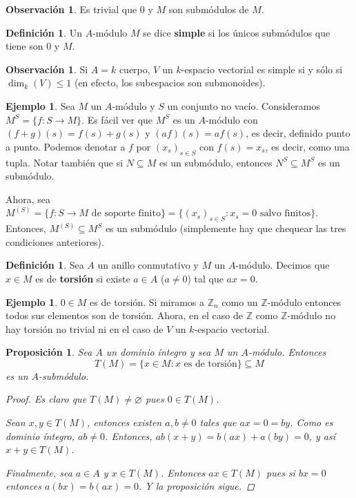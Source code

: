 \documentclass[12pt]{book}
\newtheorem{prop}[teo]{Proposición}
\theoremstyle{definition}
\newtheorem{obs}[teo]{Observación}
\newtheorem{defn}[teo]{Definición}
\newtheorem{ex}[teo]{Ejemplo}
\newcommand{\ZZ}{\mathbb{Z}}      %
\let\emptyset\varnothing
\begin{document}
\begin{obs}
Es trivial que $0$ y $M$ son submódulos de $M$.
\end{obs}

\begin{defn}
Un $A$-módulo $M$ se dice \textbf{simple} si los únicos submódulos que tiene son $0$ y $M$.
\end{defn}

\begin{obs}
Si $A=k$ cuerpo, $V$ un $k$-espacio vectorial es simple si y sólo si $\dim_k(V)\leq 1$ (en efecto, los subespacios son submonoides).
\end{obs}

\begin{ex}
Sea $M$ un $A$-módulo y $S$ un conjunto no vacío. Consideramos $M^S = \{f:S\to M\}$. Es fácil ver que $M^S$ es un $A$-módulo con $(f+g)(s)=f(s)+g(s)$ y $(af)(s)=af(s)$, es decir, definido punto a punto. Podemos denotar a $f$ por $(x_s)_{s\in S}$ con $f(s)=x_s$, es decir, como una tupla. Notar también que si $N\subseteq M$ es un submódulo, entonces $N^S\subseteq M^S$ es un submódulo.

Ahora, sea $M^{(S)}=\{f: S\to M \text{ de soporte finito}\} = \{(x_s)_{s\in S} : x_s = 0 \text{ salvo finitos}\}$. Entonces, $M^{(S)}\subseteq M^S$ es un submódulo (simplemente hay que chequear las tres condiciones anteriores).
\end{ex}

\begin{defn}
Sea $A$ un anillo conmutativo y $M$ un $A$-módulo. Decimos que $x\in M$ es de \textbf{torsión} si existe $a\in A$ ($a\neq 0$) tal que $ax=0$.
\end{defn}
\begin{ex}
$0\in M$ es de torsión. Si miramos a $\ZZ_n$ como un $\ZZ$-módulo entonces todos sus elementos son de torsión. Ahora, en el caso de $\ZZ$ como $\ZZ$-módulo no hay torsión no trivial ni en el caso de $V$ un $k$-espacio vectorial.
\end{ex}

\begin{prop}
Sea $A$ un dominio íntegro y sea $M$ un $A$-módulo. Entonces $$T(M)=\{x\in M : x\text{ es de torsión}\}\subseteq M$$ es un $A$-submódulo.
\begin{proof}
Es claro que $T(M)\neq \emptyset$ pues $0\in T(M)$.

Sean $x,y\in T(M)$, entonces existen $a,b\neq 0$ tales que $ax=0=by$. Como es dominio íntegro, $ab\neq 0$. Entonces, $ab(x+y) = b(ax)+a(by)=0$, y así $x+y\in T(M)$.

Finalmente, sea $a\in A$ y $x\in T(M)$. Entonces $ax\in T(M)$ pues si $bx=0$ entonces $a(bx)= b(ax)=0$. Y la proposición sigue.
\end{proof}
\end{prop}
\end{document}
